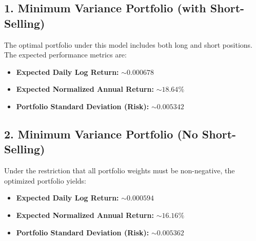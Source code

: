 \documentclass[11pt]{article}
\begin{document}
\subsection*{1. Minimum Variance Portfolio (with Short-Selling)}
The optimal portfolio under this model includes both long and short positions. The expected performance metrics are:
\begin{itemize}
    \item \textbf{Expected Daily Log Return:} $\sim 0.000678$
    \item \textbf{Expected Normalized Annual Return:} $\sim 18.64\%$
    \item \textbf{Portfolio Standard Deviation (Risk):} $\sim 0.005342$
\end{itemize}

\subsection*{2.  Minimum Variance Portfolio (No Short-Selling)}
Under the restriction that all portfolio weights must be non-negative, the optimized portfolio yields:
\begin{itemize}
    \item \textbf{Expected Daily Log Return:} $\sim 0.000594 $
    \item \textbf{Expected Normalized Annual Return:} $\sim 16.16\%$
    \item \textbf{Portfolio Standard Deviation (Risk):} $\sim 0.005362$
\end{itemize}
\end{document}
